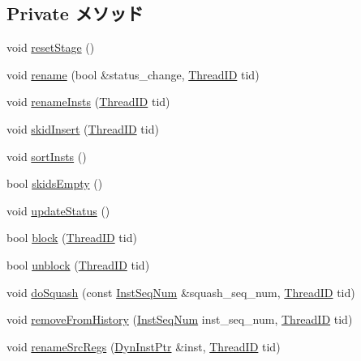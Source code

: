\subsection*{Private メソッド}
\begin{DoxyCompactItemize}
\item 
void \hyperlink{classDefaultRename_ada2a699094bc420f977abf2a17ed14c8}{resetStage} ()
\item 
void \hyperlink{classDefaultRename_ae79f7fcdd0255495d6df18c063988432}{rename} (bool \&status\_\-change, \hyperlink{base_2types_8hh_ab39b1a4f9dad884694c7a74ed69e6a6b}{ThreadID} tid)
\item 
void \hyperlink{classDefaultRename_a8ff86a7781da8390490774c08b1819f2}{renameInsts} (\hyperlink{base_2types_8hh_ab39b1a4f9dad884694c7a74ed69e6a6b}{ThreadID} tid)
\item 
void \hyperlink{classDefaultRename_ac24515147270ef9b85991bbe13bd47af}{skidInsert} (\hyperlink{base_2types_8hh_ab39b1a4f9dad884694c7a74ed69e6a6b}{ThreadID} tid)
\item 
void \hyperlink{classDefaultRename_a9ff2aa32ab0f40674cb3518108d62f8e}{sortInsts} ()
\item 
bool \hyperlink{classDefaultRename_afe3e2673d17dd5c568862ef5ae68b4d8}{skidsEmpty} ()
\item 
void \hyperlink{classDefaultRename_a4bb9486757ce225941aaaf759b357a57}{updateStatus} ()
\item 
bool \hyperlink{classDefaultRename_ad1993925abd15d3fb59fde2ccfa3d678}{block} (\hyperlink{base_2types_8hh_ab39b1a4f9dad884694c7a74ed69e6a6b}{ThreadID} tid)
\item 
bool \hyperlink{classDefaultRename_a9cc3b95f6969935f78c0158aa5145021}{unblock} (\hyperlink{base_2types_8hh_ab39b1a4f9dad884694c7a74ed69e6a6b}{ThreadID} tid)
\item 
void \hyperlink{classDefaultRename_a32818ae72457917ca9551faa708ba584}{doSquash} (const \hyperlink{inst__seq_8hh_a258d93d98edaedee089435c19ea2ea2e}{InstSeqNum} \&squash\_\-seq\_\-num, \hyperlink{base_2types_8hh_ab39b1a4f9dad884694c7a74ed69e6a6b}{ThreadID} tid)
\item 
void \hyperlink{classDefaultRename_a4e15b4f66caef87aacbd195e4a02804d}{removeFromHistory} (\hyperlink{inst__seq_8hh_a258d93d98edaedee089435c19ea2ea2e}{InstSeqNum} inst\_\-seq\_\-num, \hyperlink{base_2types_8hh_ab39b1a4f9dad884694c7a74ed69e6a6b}{ThreadID} tid)
\item 
void \hyperlink{classDefaultRename_a8c18390fbeba66214f3854d7325a1d0e}{renameSrcRegs} (\hyperlink{classDefaultRename_a028ce10889c5f6450239d9e9a7347976}{DynInstPtr} \&inst, \hyperlink{base_2types_8hh_ab39b1a4f9dad884694c7a74ed69e6a6b}{ThreadID} tid)

\end{DoxyCompactItemize}
